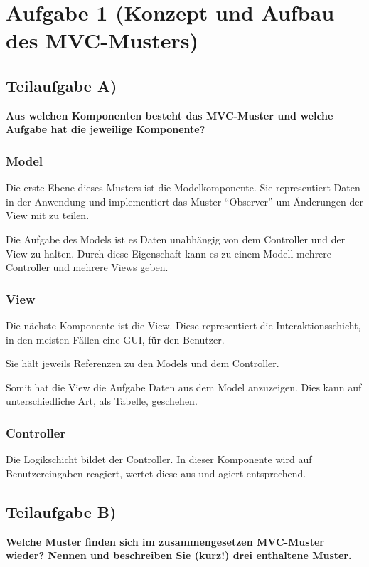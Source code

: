 \section{Aufgabe 1 (Konzept und Aufbau des MVC-Musters)}

\subsection{Teilaufgabe A)}
\textbf{Aus welchen Komponenten besteht das MVC-Muster und welche Aufgabe hat die
jeweilige Komponente?}

\subsubsection{Model}
Die erste Ebene dieses Musters ist die Modelkomponente. Sie representiert
Daten in der Anwendung und implementiert das Muster "`Observer"' um Änderungen
der View mit zu teilen.

Die Aufgabe des Models ist es Daten unabhängig von dem Controller und der View
zu halten. Durch diese Eigenschaft kann es zu einem Modell mehrere Controller
und mehrere Views geben.

\subsubsection{View}
Die nächste Komponente ist die View. Diese representiert die
Interaktionsschicht, in den meisten Fällen eine GUI, für den Benutzer.

Sie hält jeweils Referenzen zu den Models und dem Controller.

Somit hat die View die Aufgabe Daten aus dem Model anzuzeigen. Dies kann auf
unterschiedliche Art, \zB als Tabelle, geschehen.

\subsubsection{Controller}

Die Logikschicht bildet der Controller. In dieser Komponente wird auf
Benutzereingaben reagiert, wertet diese aus und agiert entsprechend.

\clearpage
\subsection{Teilaufgabe B)}
\textbf{Welche Muster finden sich im zusammengesetzen MVC-Muster wieder? Nennen und
beschreiben Sie (kurz!) drei enthaltene Muster.}

